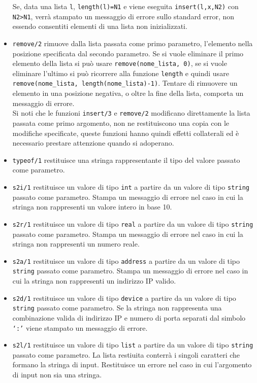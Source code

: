 \documentclass[10pt]{article}
\begin{document}
\begin{itemize}
Se, data una lista \texttt{l}, \texttt{length(l)=N1} e viene eseguita \texttt{insert(l,x,N2)} con \texttt{N2>N1}, verrà stampato un messaggio di errore sullo standard error, non essendo consentiti elementi di una lista non inizializzati.
\item \texttt{remove/2} rimuove dalla lista passata come primo parametro, l'elemento nella posizione specificata dal secondo parametro. Se si vuole eliminare il primo elemento della lista si può usare \texttt{remove(nome\_lista, 0)}, se si vuole eliminare l'ultimo si può ricorrere alla funzione \texttt{length} e quindi usare \texttt{remove(nome\_lista, length(nome\_lista)-1)}. Tentare di rimuovere un elemento in una posizione negativa, o oltre la fine della lista, comporta un messaggio di errore.\\
Si noti che le funzioni \texttt{insert/3} e \texttt{remove/2} modificano direttamente la lista passata come primo argomento, non ne restituiscono una copia con le modifiche specificate, queste funzioni hanno quindi effetti collaterali ed è necessario prestare attenzione quando si adoperano.
\item \texttt{typeof/1} restituisce una stringa rappresentante il tipo del valore passato come parametro.
\item \texttt{s2i/1} restituisce un valore di tipo \texttt{int} a partire da un valore di tipo \texttt{string} passato come parametro. Stampa un messaggio di errore nel caso in cui la stringa non rappresenti un valore intero in base 10.
\item \texttt{s2r/1} restituisce un valore di tipo \texttt{real} a partire da un valore di tipo \texttt{string} passato come parametro. Stampa un messaggio di errore nel caso in cui la stringa non rappresenti un numero reale. 
\item \texttt{s2a/1} restituisce un valore di tipo \texttt{address} a partire da un valore di tipo \texttt{string} passato come parametro. Stampa un messaggio di errore nel caso in cui la stringa non rappresenti un indirizzo IP valido.  
\item \texttt{s2d/1} restituisce un valore di tipo \texttt{device} a partire da un valore di tipo \texttt{string} passato come parametro.
Se la stringa non rappresenta una combinazione valida di indirizzo IP e numero di porta separati dal simbolo \texttt{`:'} viene stampato un messaggio di errore.  
\item \texttt{s2l/1} restituisce un valore di tipo \texttt{list} a partire da un valore di tipo \texttt{string} passato come parametro. La lista restiuita conterrà i singoli caratteri che formano la stringa di input. Restituisce un errore nel caso in cui l'argomento di input non sia una stringa.\\

\end{itemize}
\end{document}
